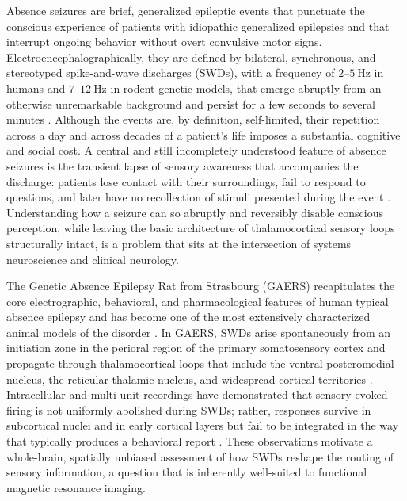 \documentclass[11pt]{article}
\begin{document}
Absence seizures are brief, generalized epileptic events that punctuate the conscious experience of patients with idiopathic generalized epilepsies and that interrupt ongoing behavior without overt convulsive motor signs. Electroencephalographically, they are defined by bilateral, synchronous, and stereotyped spike-and-wave discharges (SWDs), with a frequency of $2$--$5~\si{\hertz}$ in humans and $7$--$12~\si{\hertz}$ in rodent genetic models, that emerge abruptly from an otherwise unremarkable background and persist for a few seconds to several minutes \citep{szaflarski2010,crunelli2002}. Although the events are, by definition, self-limited, their repetition across a day and across decades of a patient's life imposes a substantial cognitive and social cost. A central and still incompletely understood feature of absence seizures is the transient lapse of sensory awareness that accompanies the discharge: patients lose contact with their surroundings, fail to respond to questions, and later have no recollection of stimuli presented during the event \citep{blumenfeld2012,ferri2025}. Understanding how a seizure can so abruptly and reversibly disable conscious perception, while leaving the basic architecture of thalamocortical sensory loops structurally intact, is a problem that sits at the intersection of systems neuroscience and clinical neurology.

The Genetic Absence Epilepsy Rat from Strasbourg (GAERS) recapitulates the core electrographic, behavioral, and pharmacological features of human typical absence epilepsy and has become one of the most extensively characterized animal models of the disorder \citep{marescaux1992,danober1998}. In GAERS, SWDs arise spontaneously from an initiation zone in the perioral region of the primary somatosensory cortex and propagate through thalamocortical loops that include the ventral posteromedial nucleus, the reticular thalamic nucleus, and widespread cortical territories \citep{polack2007,meeren2002}. Intracellular and multi-unit recordings have demonstrated that sensory-evoked firing is not uniformly abolished during SWDs; rather, responses survive in subcortical nuclei and in early cortical layers but fail to be integrated in the way that typically produces a behavioral report \citep{chipaux2013}. These observations motivate a whole-brain, spatially unbiased assessment of how SWDs reshape the routing of sensory information, a question that is inherently well-suited to functional magnetic resonance imaging.
\end{document}
